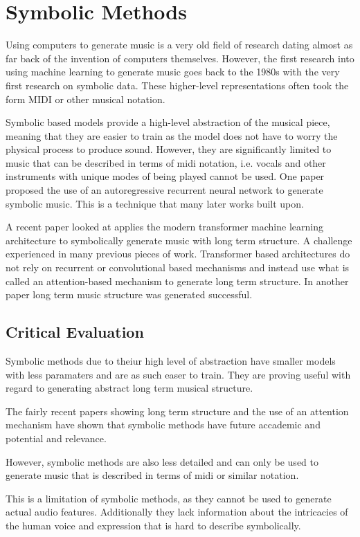 \section{Symbolic Methods}

Using computers to generate music is a very old field of research dating almost as far back of the invention of computers themselves\cite{Hiller1958Musical}. However, the first research into using machine learning to generate music goes back to the 1980s\cite{ConnectionistComposition}\cite{GradientDescentLearning} with the very first research on symbolic data. These higher-level representations often took the form MIDI or other musical notation.

Symbolic based models provide a high-level abstraction of the musical piece, meaning that they are easier to train as the model does not have to worry the physical process to produce sound. However, they are significantly limited to music that can be described in terms of midi notation, i.e. vocals and other instruments with unique modes of being played cannot be used. One paper proposed the use of an autoregressive recurrent neural network to generate symbolic music. This is a technique that many later works built upon.

A recent paper looked at applies the modern transformer machine learning architecture to symbolically generate music with long term structure. A challenge experienced in many previous pieces of work\cite{LongTermStructure}. Transformer based architectures do not rely on recurrent or convolutional based mechanisms and instead use what is called an attention-based mechanism to generate long term structure\cite{Attention}. In another paper \cite{LongTermStructure} long term music structure was generated successful.

\subsection{Critical Evaluation}

Symbolic methods due to theiur high level of abstraction have smaller models with less paramaters and are as such easer to train. They are proving useful with regard to generating abstract long term musical structure.

The fairly recent papers showing long term structure\cite{LongTermStructure} and the use of an attention mechanism\cite{Attention} have shown that symbolic methods have future accademic and potential and relevance.

However, symbolic methods are also less detailed and can only be used to generate music that is described in terms of midi or similar notation.

This is a limitation of symbolic methods, as they cannot be used to generate actual audio features. Additionally they lack information about the intricacies of the human voice and expression that is hard to describe symbolically.